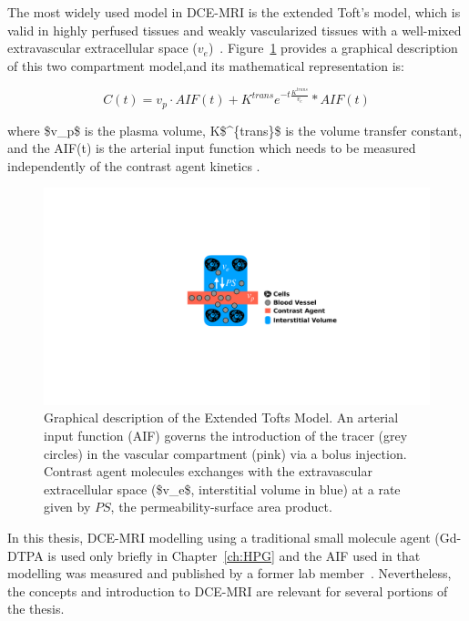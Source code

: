 The most widely used model in \acs{DCE-MRI} is the extended Toft's model, which is valid in highly perfused tissues and weakly vascularized tissues with a well-mixed extravascular extracellular space ($v_e$)~\cite{Sourbron:2013jz}.
Figure~\ref{XTofts} provides a graphical description of this two compartment model,and its mathematical representation is:

\begin{equation}
C(t) = v_p \cdot AIF(t) + K^{trans}e^{-t\frac{K^{trans}}{v_e}} * AIF(t)
\end{equation}

where \acs{$v_p$} is the plasma volume, \acs{K$^{trans}$} is the volume transfer constant, and the \acs{AIF}(t) is the arterial input function which needs to be measured independently of the contrast agent kinetics .

\begin{figure}[htbp]
   \centering
   \includegraphics[width=\textwidth]{intro/intro-images/XTofts.pdf}
   \caption[Extended Tofts Model]{Graphical description of the Extended Tofts Model. An arterial input function (\acs{AIF}) governs the introduction of the tracer (grey circles) in the vascular compartment (pink) via a bolus injection. Contrast agent molecules exchanges with the extravascular extracellular space (\acs{$v_e$}, interstitial volume in blue) at a rate given by $PS$, the permeability-surface area product.}
   \label{XTofts}
\end{figure}

In this thesis, \acs{DCE-MRI} modelling using a traditional small molecule agent (\acs{Gd-DTPA} is used only briefly in Chapter~\ref{ch:HPG} and the \acs{AIF} used in that modelling was measured and published by a former lab member~\cite{Moroz:2013ee}.
Nevertheless, the concepts and introduction to \acs{DCE-MRI} are relevant for several portions of the thesis. 

